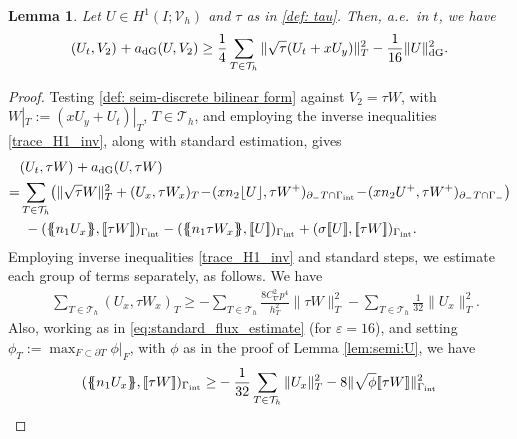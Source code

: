 \documentclass{amsart}
\newcommand{\norm}[2]{\|{#1}\|_{{#2}}}
\newcommand{\jump}[1]{[\kern-0.6mm [{#1}]\kern-0.6mm]}
\newcommand{\av}[1]{\{\kern-1.2mm \{{#1}\}\kern-1.2mm\}}
\newcommand{\su}{\sum_{T \in \Th}}
\newcommand{\inner}[3]{({#1},{#2})_{{#3}}}
\newcommand{\Th}{\mathcal{T}_h}
\newcommand{\gint}{\Gamma_{\rm int}}
\newcommand{\gif}{\Gamma_-}
\newcommand{\cinv}{C_{\nabla}}
\newcommand{\normal}{{n}}
\newcommand{\jumpu}[1]{ \lfloor #1 \rfloor }
\newcommand{\avg }[1]{ \av{ #1}}
\newcommand{\utr}{W}
\newtheorem{lemma}[theorem]{Lemma}
\theoremstyle{definition}
\theoremstyle{remark}
\numberwithin{equation}{section}
\begin{document}
\begin{lemma}\label{lem:semi:supg}
    Let $U \in H^1(I; {\mathcal{V}}_h)$ and $\tau$ as in \eqref{def: tau}. Then, a.e.~in $t$, we have
    \begin{equation}\label{eq:semi:supg}
        \inner{U_t}{V_2}{} + a_{\rm dG}(U,V_2)
        \geq
        \frac{1}{4} \sum_{T \in \Th} \norm{ \sqrt{\tau}(U_t + xU_y) }{T}^2 - \frac{1}{16} \norm{U}{\rm dG}^2.
    \end{equation}
\end{lemma}
\begin{proof}
Testing \eqref{def: seim-discrete bilinear form} against $V_2=\tau \utr$, with $\utr|_T:=(x U_y + U_t)|_T$, $T\in\Th$, and employing the inverse inequalities \eqref{trace_H1_inv}, along with standard estimation, gives
\begin{equation*}\begin{split}
    &  \inner{U_t}{\tau\utr}{} + a_{\rm dG}(U,\tau\utr) \\
   =&
    \sum_{T \in \Th}\!\big(
    \norm{\sqrt{\tau}\utr}{T}^2
    +
    \inner{U_x}{\tau\utr_x }{T}\!-\!
    \inner{x\normal_2 \jumpu{U}}{\tau W^+}{\partial_- T \cap \gint}
    \!-\!
    \inner{x\normal_2 U^+}{\tau W^+}{\partial_- T \cap \gif}\big)\\
   &\ -
    \inner{\avg{\normal_1 U_x}}{\jump{\tau\utr}}{\gint}
    -
    \inner{\avg{\normal_1 \tau\utr_x}}{\jump{U}}{\gint }
   +
    \inner{\sigma \jump{U}}{\jump{\tau\utr}}{\gint }.
\end{split}\end{equation*}
Employing inverse inequalities \eqref{trace_H1_inv} and standard steps, we estimate each group of terms separately, as follows. We have
\begin{equation*}\begin{split}
	&	  \sum_{T \in \Th}
		\inner{U_x}{\tau\utr_x }{T}
 \ge 	-\sum_{T \in \Th}
\frac{8 \cinv^2 p^4}{h_T^2}  \norm{\tau\utr }{T}^2 -\sum_{T \in \Th}\frac{1}{32}\norm{U_x}{T}^2.
\end{split}\end{equation*}
Also, working as in \eqref{eq:standard_flux_estimate} (for $\varepsilon=16$), and setting $\phi_T:=\max_{F\subset\partial T}\phi|_F$, with $\phi$ as in the proof of Lemma \ref{lem:semi:U}, we have
\begin{equation}\begin{split}\label{eq:double_inv_flux_estimate}
		\inner{\avg{\normal_1 U_x}}{\jump{\tau\utr}}{\gint}
		\ge&
		-
		\frac{1}{32}\su \norm{U_x}{T}^2 -8 \norm{\sqrt{\phi}\jump{\tau\utr}}{\gint}^2\\

\end{split}
\end{equation}
\end{proof}
\end{document}
